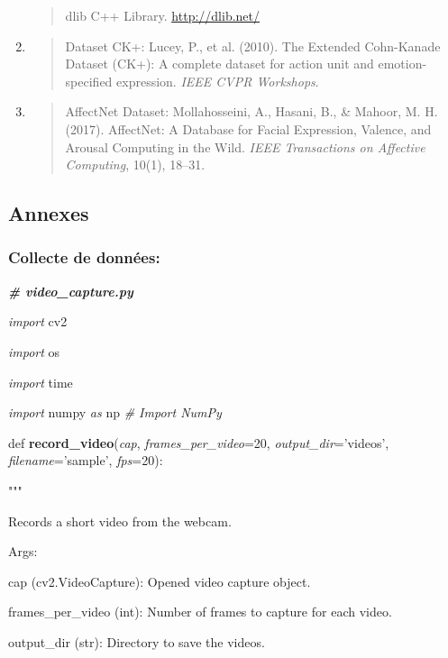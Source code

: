 \documentclass[
]{article}
\begin{document}
\begin{enumerate}
  \begin{quote}
  dlib C++ Library. \href{http://dlib.net/}{\underline{http://dlib.net/\\
  }}
  \end{quote}
\item
  \begin{quote}
  Dataset CK+: Lucey, P., et al. (2010). The Extended Cohn-Kanade Dataset (CK+): A complete dataset for action unit and emotion-specified expression. \emph{IEEE CVPR Workshops}.
  \end{quote}
\item
  \begin{quote}
  AffectNet Dataset: Mollahosseini, A., Hasani, B., \& Mahoor, M. H. (2017). AffectNet: A Database for Facial Expression, Valence, and Arousal Computing in the Wild. \emph{IEEE Transactions on Affective Computing}, 10(1), 18--31.
  \end{quote}
\end{enumerate}

\hypertarget{annexes}{%
\subsection{Annexes}\label{annexes}}

\hypertarget{collecte-de-donnuxe9es}{%
\subsubsection{Collecte de données:}\label{collecte-de-donnuxe9es}}

\emph{\textbf{\# video\_capture.py}}

\emph{import} cv2

\emph{import} os

\emph{import} time

\emph{import} numpy \emph{as} np \emph{\# Import NumPy}

def \textbf{record\_video}(\emph{cap}, \emph{frames\_per\_video}=20, \emph{output\_dir}='videos', \emph{filename}='sample', \emph{fps}=20):

"""

Records a short video from the webcam.

Args:

cap (cv2.VideoCapture): Opened video capture object.

frames\_per\_video (int): Number of frames to capture for each video.

output\_dir (str): Directory to save the videos.
\end{document}
